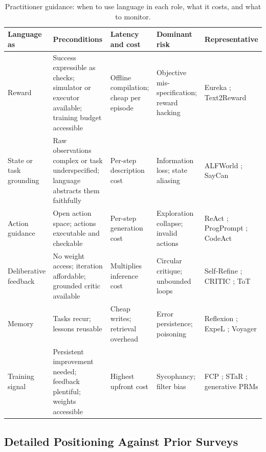 \begin{table}[t]
    \centering
    \footnotesize
    \renewcommand{\arraystretch}{1.2}
    \caption{Practitioner guidance: when to use language in each role, what it costs, and what to monitor.}
    \label{supp:tab:practitioner}
    \begin{tabular}{@{} p{} p{} p{} p{} p{} @{}}
        \toprule
        \textbf{Language as} & \textbf{Preconditions} & \textbf{Latency and cost} & \textbf{Dominant risk} & \textbf{Representative} \\
        \midrule
        Reward & Success expressible as checks; simulator or executor available; training budget accessible & Offline compilation; cheap per episode & Objective mis-specification; reward hacking & Eureka \citep{ma2024eureka}; Text2Reward \citep{xie2024text2reward} \\
        State or task grounding & Raw observations complex or task underspecified; language abstracts them faithfully & Per-step description cost & Information loss; state aliasing & ALFWorld \citep{shridhar2020alfworld}; SayCan \citep{ahn2022can} \\
        Action guidance & Open action space; actions executable and checkable & Per-step generation cost & Exploration collapse; invalid actions & ReAct \citep{yao2023react}; ProgPrompt \citep{singh2022progprompt}; CodeAct \citep{wang2024executable} \\
        Deliberative feedback & No weight access; iteration affordable; grounded critic available & Multiplies inference cost & Circular critique; unbounded loops & Self-Refine \citep{madaan2023selfrefine}; CRITIC \citep{gou2024critic}; ToT \citep{yao2023tree} \\
        Memory & Tasks recur; lessons reusable & Cheap writes; retrieval overhead & Error persistence; poisoning & Reflexion \citep{shinn2023reflexion}; ExpeL \citep{zhao2024expel}; Voyager \citep{wang2023voyager} \\
        Training signal & Persistent improvement needed; feedback plentiful; weights accessible & Highest upfront cost & Sycophancy; filter bias & FCP \citep{luo2025fcp}; STaR \citep{zelikman2022star}; generative PRMs \citep{zhao2025genprm} \\
        \bottomrule
    \end{tabular}
\end{table}

\subsection{Detailed Positioning Against Prior Surveys}
\label{supp:subsec:prior-survey-clusters}

